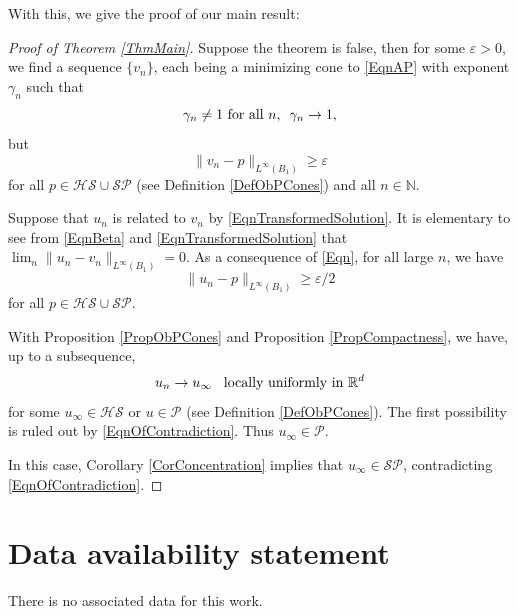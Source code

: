 \documentclass{amsart}
\def\R {\mathbb{R}}
\def\N{\mathbb{N}}
\def\eps{\varepsilon}
\def\HS{\mathcal{HS}}
\def\P{\mathcal{P}}
\def\SP{\mathcal{SP}}
\def\hem{\hspace{0.5em}}
\def\vem{\vspace{0.6em}}
\theoremstyle{definition}
\numberwithin{equation}{section}
\theoremstyle{remark}
\begin{document}
With this, we give the proof of our main result:
\begin{proof}[Proof of Theorem \ref{ThmMain}]
Suppose the theorem is false, then for some $\eps>0$, we  find a sequence  $\{v_n\}$, each being a minimizing cone to \eqref{EqnAP} with exponent $\gamma_n$ such that 
$$
\gamma_n\neq 1 \text{ for all }n, \hem\gamma_n\to1,
$$
but 
\begin{equation}
\label{Eqn}
\|v_n-p\|_{L^\infty(B_1)}\ge\eps
\end{equation}
for all $p\in\HS\cup\SP$ (see Definition \ref{DefObPCones}) and all $n\in\N.$

Suppose that $u_n$ is related to $v_n$ by \eqref{EqnTransformedSolution}. It is elementary to see from \eqref{EqnBeta} and \eqref{EqnTransformedSolution} that
$\lim_n\|u_n-v_n\|_{L^\infty(B_1)}=0.$
As a consequence of \eqref{Eqn}, for all large $n$,  we have 
\begin{equation}
\label{EqnOfContradiction}
\|u_n-p\|_{L^\infty(B_1)}\ge\eps/2
\end{equation}
for all $p\in\HS\cup\SP$.

\vem


With Proposition \ref{PropObPCones} and   Proposition \ref{PropCompactness}, we have, up to a subsequence, 
$$
u_n\to u_\infty \hem \text{ locally uniformly in }\R^d
$$
for some $u_\infty\in\HS$ or $u\in\P$ (see Definition \ref{DefObPCones}).  
 The first possibility is ruled out by \eqref{EqnOfContradiction}. Thus $u_\infty\in\P$. 

In this case, Corollary \ref{CorConcentration} implies that $u_\infty\in\SP$, contradicting \eqref{EqnOfContradiction}.
\end{proof} 


















\section*{Data availability statement}
There is no associated data for this work. 
\end{document}
